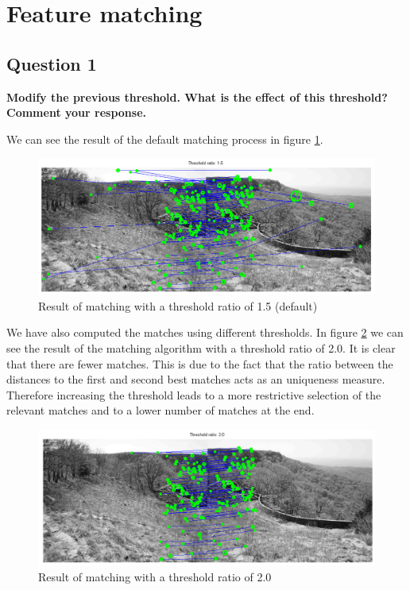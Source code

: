 \section{Feature matching}

\subsection{Question 1}

{\bfseries Modify the previous threshold. What is the effect of this
threshold? Comment your response.}

We can see the result of the default matching process in figure \ref{fig:matching15thres}.

\begin{figure}[htb]
	\centering
		\includegraphics[width=\textwidth]{./img/ex1/matching_15_thres.png}
	\caption{Result of matching with a threshold ratio of 1.5 (default)}
	\label{fig:matching15thres}
\end{figure}

We have also computed the matches using different thresholds. In figure
\ref{fig:matching20thres} we can see the result of the matching algorithm
with a threshold ratio of 2.0. It is clear that there are fewer matches. This is
due to the fact that the ratio between the distances to the first and second best
matches acts as an uniqueness measure. Therefore increasing the threshold leads
to a more restrictive selection of the relevant matches and to a lower number of
matches at the end.

\begin{figure}[htb]
	\centering
		\includegraphics[width=\textwidth]{./img/ex1/matching_20_thres.png}
	\caption{Result of matching with a threshold ratio of 2.0}
	\label{fig:matching20thres}
\end{figure}

